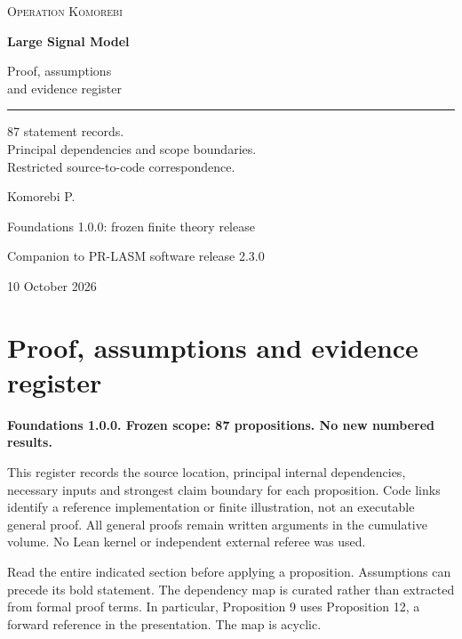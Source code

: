 \documentclass[11pt,letterpaper]{article}
\begin{document}
\hypersetup{pageanchor=false}
\begin{titlepage}
\vspace*{0.5in}
{\small\textsc{Operation Komorebi}\par}
\vspace{0.72in}
{\fontsize{33}{39}\selectfont\bfseries Large Signal Model\par}
\vspace{0.3in}
{\fontsize{21}{27}\selectfont Proof, assumptions\\and evidence register\par}
\vspace{0.45in}
\rule{\textwidth}{0.45pt}\par
\vspace{0.3in}
\begin{minipage}{0.95\textwidth}
\large
87 statement records.\\Principal dependencies and scope boundaries.\\Restricted source-to-code correspondence.
\end{minipage}
\vfill
{\Large Komorebi P.\par}
\vspace{0.2in}
{\normalsize Foundations 1.0.0: frozen finite theory release\par}
{\normalsize Companion to PR-LASM software release 2.3.0\par}
{\normalsize 10 October 2026\par}
\end{titlepage}
\hypersetup{pageanchor=true}
\begingroup\footnotesize\setlength{\cftbeforesecskip}{0pt}\tableofcontents\endgroup\newpage

\section{Proof, assumptions and evidence
register}\label{proof-assumptions-and-evidence-register}

\textbf{Foundations 1.0.0. Frozen scope: 87 propositions. No new
numbered results.}

This register records the source location, principal internal
dependencies, necessary inputs and strongest claim boundary for each
proposition. Code links identify a reference implementation or finite
illustration, not an executable general proof. All general proofs remain
written arguments in the cumulative volume. No Lean kernel or
independent external referee was used.

Read the entire indicated section before applying a proposition.
Assumptions can precede its bold statement. The dependency map is
curated rather than extracted from formal proof terms. In particular,
Proposition 9 uses Proposition 12, a forward reference in the
presentation. The map is acyclic.
\end{document}
